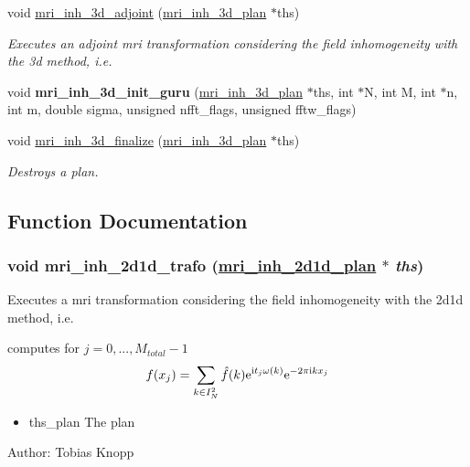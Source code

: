 \begin{CompactItemize}
void \hyperlink{group__mri_ga5}{mri\_\-inh\_\-3d\_\-adjoint} (\hyperlink{structmri__inh__3d__plan}{mri\_\-inh\_\-3d\_\-plan} $\ast$ths)
\begin{CompactList}\small\item\em Executes an adjoint mri transformation considering the field inhomogeneity with the 3d method, i.e. \item\end{CompactList}\item 
\hypertarget{group__mri_ga6}{
void {\bf mri\_\-inh\_\-3d\_\-init\_\-guru} (\hyperlink{structmri__inh__3d__plan}{mri\_\-inh\_\-3d\_\-plan} $\ast$ths, int $\ast$N, int M, int $\ast$n, int m, double sigma, unsigned nfft\_\-flags, unsigned fftw\_\-flags)}
\label{group__mri_ga6}

\item 
void \hyperlink{group__mri_ga7}{mri\_\-inh\_\-3d\_\-finalize} (\hyperlink{structmri__inh__3d__plan}{mri\_\-inh\_\-3d\_\-plan} $\ast$ths)
\begin{CompactList}\small\item\em Destroys a plan. \item\end{CompactList}\end{CompactItemize}


\subsection{Function Documentation}
\hypertarget{group__mri_ga0}{
\subsubsection[mri\_\-inh\_\-2d1d\_\-trafo]{\setlength{\rightskip}{0pt plus 5cm}void mri\_\-inh\_\-2d1d\_\-trafo (\hyperlink{structmri__inh__2d1d__plan}{mri\_\-inh\_\-2d1d\_\-plan} $\ast$ {\em ths})}}
\label{group__mri_ga0}


Executes a mri transformation considering the field inhomogeneity with the 2d1d method, i.e. 

computes for $j=0,...,M_{total}-1$ \[ f(x_j) = \sum_{k \in I_N^2} \hat{f}(k) {\rm e}^{\mbox{\rm\scriptsize i} t_j \omega(k)} {\rm e}^{-2 \pi \mbox{\rm\scriptsize i} k x_j} \]

\begin{itemize}
\item ths\_\-plan The plan\end{itemize}
\begin{Desc}
\item[Author:]Tobias Knopp \end{Desc}


